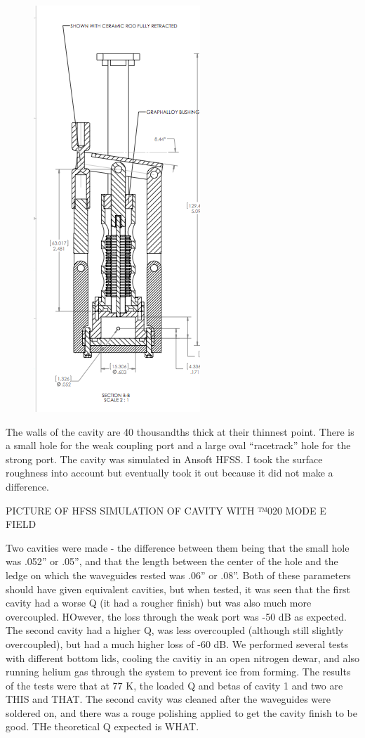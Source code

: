 \documentclass[11pt]{article}
\begin{document}
\begin{figure}
\includegraphics[scale=0.7]{AxionEngineeringDrawing}
\end{figure}

The walls of the cavity are 40 thousandths thick at their thinnest point. There is a small hole for the weak coupling port and a large oval “racetrack” hole for the strong port.  The cavity was simulated in Ansoft HFSS. I took the surface roughness into account but eventually took it out because it did not make a difference. 

PICTURE OF HFSS SIMULATION OF CAVITY WITH ™020 MODE E FIELD

Two cavities were made - the difference between them being that the small hole was .052” or .05”, and that the length between the center of the hole and the ledge on which the waveguides rested was .06” or .08”. Both of these parameters should have given equivalent cavities, but when tested, it was seen that the first cavity had a worse Q (it had a rougher finish) but was also much more overcoupled. HOwever, the loss through the weak port was -50 dB as expected. The second cavity had a higher Q, was less overcoupled (although still slightly overcoupled), but had a much higher loss of -60 dB. We performed several tests with different bottom lids, cooling the cavitiy in an open nitrogen dewar, and also running helium gas through the system to prevent ice from forming. The results of the tests were that at 77 K, the loaded Q and betas of cavity 1 and two are THIS and THAT. The second cavity was cleaned after the waveguides were soldered on, and there was a rouge polishing applied to get the cavity finish to be good. THe theoretical Q expected is WHAT.
\end{document}
